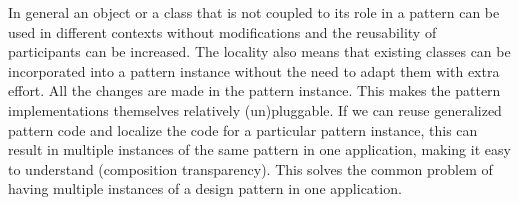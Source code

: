


In general an object or a class that is not coupled to its role in a pattern can be used in different contexts without modifications and the reusability of participants can be increased. 
The locality also means that existing classes can be incorporated into a pattern instance without the need to adapt them with extra effort. All the changes are made in the pattern instance. 
This makes the pattern implementations themselves relatively (un)pluggable. 
If we can reuse generalized pattern code and localize the code for a particular pattern instance, this can result in multiple instances of the same pattern in one application, making it easy to understand (composition transparency). 
This solves the common problem of having multiple instances of a design pattern in one application.

